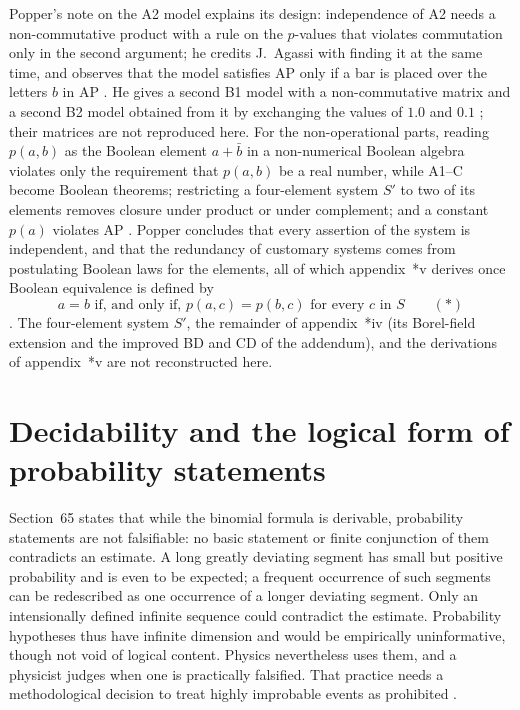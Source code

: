Popper's note on the A2 model explains its design: independence of A2
needs a non-commutative product with a rule on the \(p\)-values that
violates commutation only in the second argument; he credits J.~Agassi
with finding it at the same time, and observes that the model satisfies
AP only if a bar is placed over the letters \(b\) in AP
\parencite[appendix~*iv, note~10, p.~345]{Popper2002LogicDiscoveryUI}.
He gives a second B1 model with a non-commutative matrix and a second B2
model obtained from it by exchanging the values of \(1.0\) and \(0.1\)
\parencite[appendix~*iv, pp.~346--347]{Popper2002LogicDiscoveryUI}; their
matrices are not reproduced here. For the non-operational parts, reading
\(p(a,b)\) as the Boolean element \(a+\bar b\) in a non-numerical Boolean
algebra violates only the requirement that \(p(a,b)\) be a real number,
while A1--C become Boolean theorems; restricting a four-element system
\(S'\) to two of its elements removes closure under product or under
complement; and a constant \(p(a)\) violates AP
\parencite[appendix~*iv, pp.~347--348]{Popper2002LogicDiscoveryUI}.
Popper concludes that every assertion of the system is independent, and
that the redundancy of customary systems comes from postulating Boolean
laws for the elements, all of which appendix~*v derives once Boolean
equivalence is defined by
\[
 a=b\text{ if, and only if, }p(a,c)=p(b,c)\text{ for every }c\text{ in }S\qquad(*)
\]
\parencite[appendix~*iv, pp.~348--349]{Popper2002LogicDiscoveryUI}.
The four-element system \(S'\), the remainder of appendix~*iv (its
Borel-field extension and the improved BD and CD of the addendum), and
the derivations of appendix~*v are not reconstructed here.

\section{Decidability and the logical form of probability statements}
\label{sec:p15-w02b-p15-027-decidability}

Section~65 states that while the binomial formula is derivable,
probability statements are not falsifiable: no basic statement or finite
conjunction of them contradicts an estimate. A long greatly deviating
segment has small but positive probability and is even to be expected;
a frequent occurrence of such segments can be redescribed as one
occurrence of a longer deviating segment. Only an intensionally defined
infinite sequence could contradict the estimate. Probability hypotheses
thus have infinite dimension and would be empirically uninformative,
though not void of logical content. Physics nevertheless uses them, and
a physicist judges when one is practically falsified. That practice
needs a methodological decision to treat highly improbable events as
prohibited \parencite[\S65 and note~1]{Popper2002LogicDiscoveryUI}.

